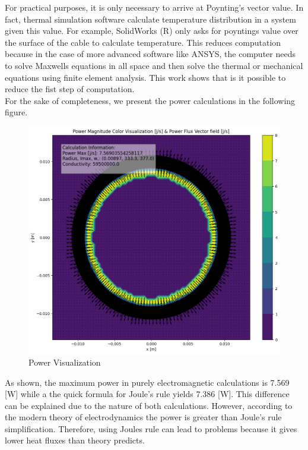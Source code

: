 For practical purposes, it is only necessary to arrive at Poynting's vector value. In fact, thermal simulation software calculate temperature distribution in a system given this value. For example, SolidWorks (R) only asks for poyntings value over the surface of the cable to calculate temperature. This reduces computation because in the case of more advanced software like ANSYS, the computer needs to solve Maxwells equations in all space and then solve the thermal or mechanical equations using finite element analysis. This work shows that is it possible to reduce the fist step of computation.
\\
For the sake of completeness, we present the power calculations in the following figure.
\begin{figure}[H]
    \centering
    \includegraphics[scale=0.35]{Figures/power-q-cable.png}
    \caption{Power Visualization}
    \label{fig:power-colorquiver}
\end{figure}
As shown, the maximum power in purely electromagnetic calculations is 7.569 [W] while a the quick formula for Joule's rule yields 7.386 [W]. This difference can be explained due to the nature of both calculations. However, according to the modern theory of electrodynamics the power is greater than Joule's rule simplification. Therefore, using Joules rule can lead to problems because it gives lower heat fluxes than theory predicts.

